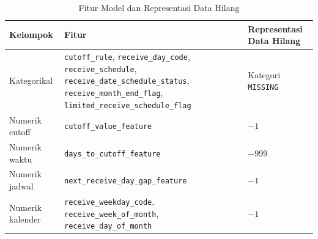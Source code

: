 \begin{table}[htbp]
    \centering
    \caption{Fitur Model dan Representasi Data Hilang}
    \label{tab:fitur-model-komparatif}
    \scriptsize
    \renewcommand{\arraystretch}{1.2}
    \begin{tabularx}{\textwidth}{p{}X p{}}
        \toprule
        \textbf{Kelompok} & \textbf{Fitur} & \textbf{Representasi Data Hilang} \\
        \midrule
        Kategorikal & \texttt{cutoff\_rule}, \texttt{receive\_day\_code}, \texttt{receive\_schedule}, \texttt{receive\_date\_schedule\_status}, \texttt{receive\_month\_end\_flag}, \texttt{limited\_receive\_schedule\_flag} & Kategori \texttt{MISSING} \\
        Numerik cutoff & \texttt{cutoff\_value\_feature} & $-1$ \\
        Numerik waktu & \texttt{days\_to\_cutoff\_feature} & $-999$ \\
        Numerik jadwal & \texttt{next\_receive\_day\_gap\_feature} & $-1$ \\
        Numerik kalender & \texttt{receive\_weekday\_code}, \texttt{receive\_week\_of\_month}, \texttt{receive\_day\_of\_month} & $-1$ \\
        \bottomrule
    \end{tabularx}
\end{table}



